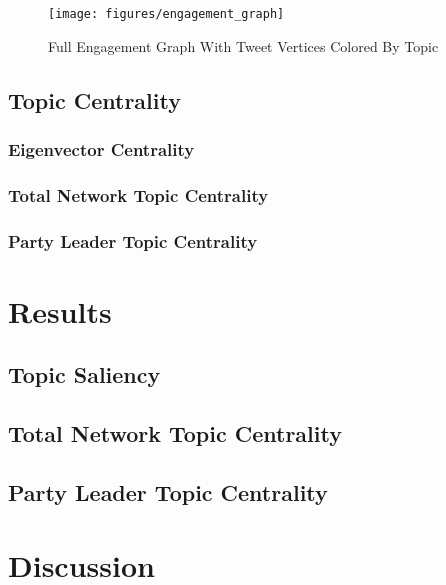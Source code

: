 \documentclass{nws}
\begin{document}
\begin{figure}[h!]
  \centering
  \texttt{[image: figures/engagement\_graph]}
  \caption[Full Engagement Graph]{Full Engagement Graph With Tweet Vertices Colored By Topic}
  \label{fig:engagement_graph}
\end{figure}

\subsection{Topic Centrality}

\subsubsection{Eigenvector Centrality}

\subsubsection{Total Network Topic Centrality}

\subsubsection{Party Leader Topic Centrality}

\section{Results}

\subsection{Topic Saliency}

\subsection{Total Network Topic Centrality}

\subsection{Party Leader Topic Centrality}

\section{Discussion}





\label{lastpage}
\end{document}
